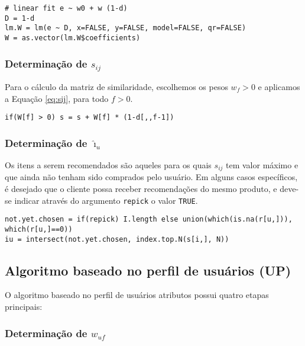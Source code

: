 \begin{lstlisting}[caption=Determinação de $w_f$,label=lst:wf]
# linear fit e ~ w0 + w (1-d)
D = 1-d
lm.W = lm(e ~ D, x=FALSE, y=FALSE, model=FALSE, qr=FALSE)
W = as.vector(lm.W$coefficients)
\end{lstlisting}

\subsubsection{Determinação de  $s_{ij}$} %
\label{ssub:determina_o_de_s__ij_}

Para o cálculo da matriz de similaridade, escolhemos os pesos $w_f>0$ e aplicamos a Equação \ref{eq:sij}, para todo $f>0$.

\begin{lstlisting}[caption=Determinação de $s_{ij}$]
if(W[f] > 0) s = s + W[f] * (1-d[,,f-1])
\end{lstlisting}

\subsubsection{Determinação de $\hat{\imath}_u$} %
\label{ssub:determina_o_de_i_u_}

Os itens a serem recomendados são aqueles para os quais $s_{ij}$ tem valor máximo e que ainda não tenham sido comprados pelo usuário. Em alguns casos específicos, é desejado que o cliente possa receber recomendações do mesmo produto, e deve-se indicar através do argumento \texttt{repick} o valor \texttt{TRUE}.

\begin{lstlisting}[caption=Determinação de $\hat{\imath}_{u}$]
not.yet.chosen = if(repick) I.length else union(which(is.na(r[u,])), which(r[u,]==0))
iu = intersect(not.yet.chosen, index.top.N(s[i,], N))
\end{lstlisting}

\subsection{Algoritmo baseado no perfil de usuários (UP)} %
\label{sub:algoritmo_baseado_no_perfil_de_usu_rios_up_}

O algoritmo baseado no perfil de usuários atributos possui quatro etapas principais: 


\subsubsection{Determinação de $w_{uf}$} %
\label{ssub:determina_o_de_wuf}

